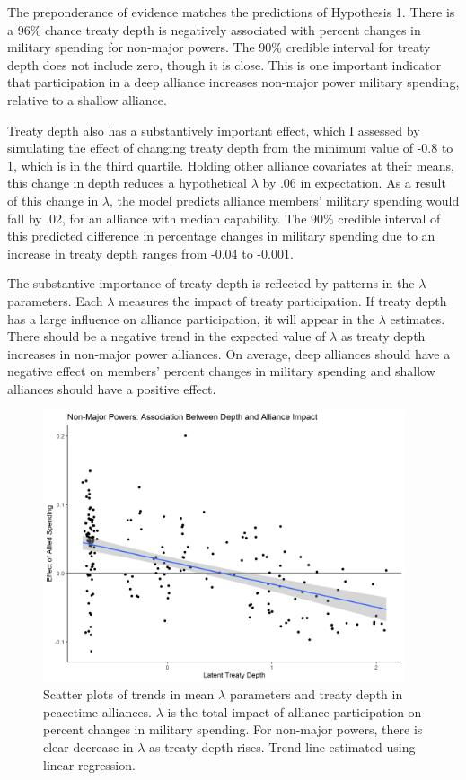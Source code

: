\documentclass[12pt]{article}
\begin{document}
The preponderance of evidence matches the predictions of Hypothesis 1. 
There is a 96\% chance treaty depth is negatively associated with percent changes in military spending for non-major powers.
The 90\% credible interval for treaty depth does not include zero, though it is close. 
This is one important indicator that participation in a deep alliance increases non-major power military spending, relative to a shallow alliance. 




Treaty depth also has a substantively important effect, which I assessed by simulating the effect of changing treaty depth from the minimum value of -0.8 to 1, which is in the third quartile. 
Holding other alliance covariates at their means, this change in depth reduces a hypothetical $\lambda$ by .06 in expectation.
As a result of this change in $\lambda$, the model predicts alliance members' military spending would fall by .02, for an alliance with median capability. 
The 90\% credible interval of this predicted difference in percentage changes in military spending due to an increase in treaty depth ranges from -0.04 to -0.001. 


The substantive importance of treaty depth is reflected by patterns in the $\lambda$ parameters. 
Each $\lambda$ measures the impact of treaty participation. 
If treaty depth has a large influence on alliance participation, it will appear in the $\lambda$ estimates. 
There should be a negative trend in the expected value of $\lambda$ as treaty depth increases in non-major power alliances.
On average, deep alliances should have a negative effect on members' percent changes in military spending and shallow alliances should have a positive effect.  


\begin{figure}[htbp]
	\centering
		\includegraphics[width=0.95\textwidth]{../figures/lambda-ld-nonmaj.png}
	\caption{Scatter plots of trends in mean $\lambda$ parameters and treaty depth in peacetime alliances. $\lambda$ is the total impact of alliance participation on percent changes in military spending. For non-major powers, there is clear decrease in $\lambda$ as treaty depth rises. Trend line estimated using linear regression.}
	\label{fig:lambda-ld-nonmaj-peace}
\end{figure}
\end{document}
